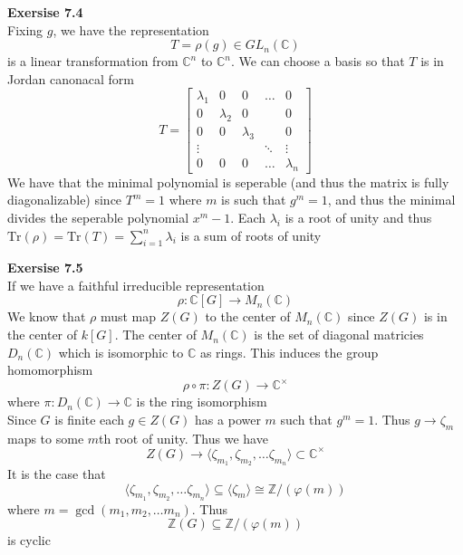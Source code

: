 \documentclass[12pt]{article}
\newenvironment{ques}[1]{\textbf{Exersise #1}\vspace{1 mm}\\ }{\bigskip}
\theoremstyle{definition}
\newcommand{\Z}{\mathbb Z}
\newcommand{\C}{\mathbb C}
\newcommand{\Tr}{\text{Tr}}
\begin{document}
\begin{ques}{7.4}
	Fixing $g$, we have the representation
	$$T = \rho(g) \in GL_n(\C)$$
	is a linear transformation from $\C^n$ to $\C^n$. We can choose a basis so
	that $T$ is in Jordan canonacal form
	$$T = 
	\begin{bmatrix}
	\lambda_1 & 0 & 0 & \dots & 0\\
	0 & \lambda_2 & 0 &  & 0\\
	0 & 0 & \lambda_3 &  & 0\\
	\vdots &  &  & \ddots & \vdots\\
	0 & 0 & 0 & \dots & \lambda_n
	\end{bmatrix}
	$$
	We have that the minimal polynomial is seperable (and thus the matrix is
	fully diagonalizable) since $T^m = 1$ where $m$ is such that $g^m = 1$, and
	thus the minimal divides the seperable polynomial $x^m - 1$. Each
	$\lambda_i$ is a root of unity and thus $\Tr(\rho) = \Tr (T) = \sum_{i=1}^n
	 \lambda_i$ is a sum of roots of unity
\end{ques}

\begin{ques}{7.5}
	If we have a
	faithful irreducible representation
	$$\rho :\C[G] \to M_n(\C)$$
	We know that $\rho$ must map $Z(G)$ to the center of $M_n(\C)$ since
	$Z(G)$ is in the center of $k[G]$. The center of $M_n(\C)$ is the set of
	diagonal matricies $D_n(\C)$ which is isomorphic to $\C$ as rings. This
	induces the group homomorphism
	$$\rho \circ \pi: Z(G) \to \C^\times$$
	where $\pi : D_n(\C) \to \C$ is the ring isomorphism \\
	Since $G$ is finite each $g \in Z(G)$ has a power $m$ such that $g^m = 1$.
	Thus $g \to \zeta_{m}$ maps to some $m$th root of unity. Thus we have
	$$Z(G) \to \langle \zeta_{m_1}, \zeta_{m_2}, \dots \zeta_{m_n}\rangle
	\subset \C^\times$$
	It is the case that
	$$\langle \zeta_{m_1}, \zeta_{m_2}, \dots \zeta_{m_n}\rangle \subseteq \langle
	\zeta_{m}\rangle \cong \Z/(\varphi(m))$$
	where $m = \gcd(m_1, m_2, \dots m_n)$. Thus
	$$\Z(G) \subseteq \Z/(\varphi(m))$$
	is cyclic
\end{ques}
\end{document}
